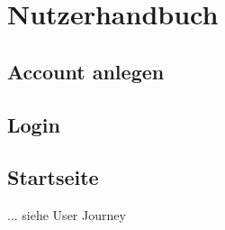 \chapter{Nutzerhandbuch}
\section{Account anlegen}
\section{Login}
\section{Startseite}
... siehe User Journey